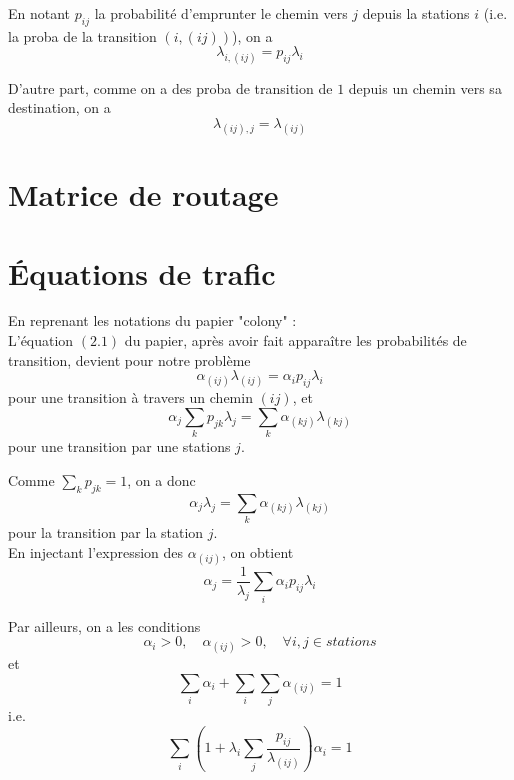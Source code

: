 \documentclass[12pt,a4paper]{article}
\begin{document}
En notant $p_{ij}$ la probabilité d'emprunter le chemin vers $j$ depuis la stations $i$ (i.e. la proba de la transition $\left(i,(ij) \right)$), on a
\[
\lambda_{i,(ij)} = p_{ij} \lambda_i
\]

D'autre part, comme on a des proba de transition de $1$ depuis un chemin vers sa destination, on a
\[
\lambda_{(ij),j} = \lambda_{(ij)}
\]


\section{Matrice de routage}




\section{\'Equations de trafic}

En reprenant les notations du papier "colony" :\\

L'équation $(2.1)$ du papier, après avoir fait apparaître les probabilités de transition, devient pour notre problème
\begin{equation}
\alpha_{(ij)} \lambda_{(ij)} = \alpha_i p_{ij} \lambda_i
\label{eq:trafic_1}
\end{equation}
pour une transition à travers un chemin $(ij)$, et
\begin{equation}
\alpha_j \sum_k p_{jk} \lambda_j = \sum_k \alpha_{(kj)} \lambda_{(kj)}
\label{eq:trafic_2}
\end{equation}
pour une transition par une stations $j$.

Comme $\sum_k p_{jk} = 1$, on a donc
\begin{equation}
\alpha_j \lambda_j = \sum_k \alpha_{(kj)} \lambda_{(kj)}
\label{eq:trafic_2_bis}
\end{equation}
pour la transition par la station $j$.\\

En injectant l'expression des $\alpha_{(ij)}$, on obtient
\begin{equation}
\alpha_j = \frac{1}{\lambda_j} \sum_i \alpha_i p_{ij} \lambda_i
\end{equation}


Par ailleurs, on a les conditions
\[
\alpha_i > 0, \quad \alpha_{(ij)} >0, \quad \forall i,j \in stations 
\]
et
\begin{equation}
\sum_i \alpha_i + \sum_i \sum_j \alpha_{(ij)} = 1
\end{equation}
i.e.
\begin{equation}
\sum_i \left(1 + \lambda_i \sum_j \frac{p_{ij}}{\lambda_{(ij)}} \right) \alpha_i = 1
\end{equation}
\end{document}
